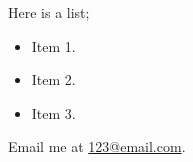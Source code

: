 \documentclass[12pt,busletter,addrfromright,orderfromdateto]{newlfm}
\begin{document}
\begin{newlfm}
	
	
	\lipsum[1]
	
	\lipsum[2]
	
	Here is a list;
	\begin{itemize}
		\item Item 1.
		\item Item 2.
		\item Item 3.
	\end{itemize}
	
	\lipsum[3]
	
	Email me at \href{mailto:123@email.com}{123@email.com}.
	
	
	
\end{newlfm}
\end{document}
